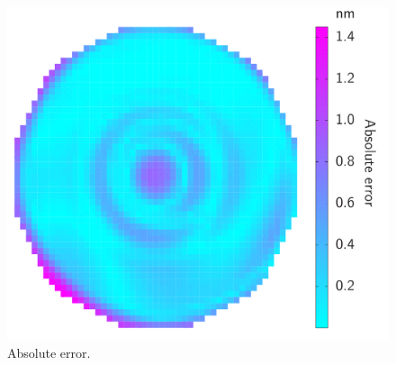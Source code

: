 \begin{figure}
  \centering
  \includegraphics[width=0.7\linewidth]{include/figures/wafer-qoi-error.pdf}
  \caption{Absolute error.}
  \vspace{-1.5em}
\end{figure}
